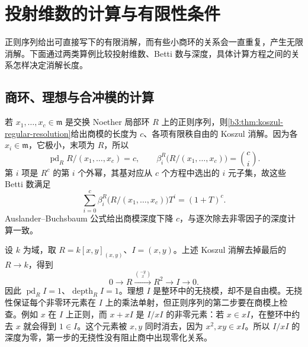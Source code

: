 
\section{投射维数的计算与有限性条件}
\label{b3:sec:1704}

正则序列给出可直接写下的有限消解，而有些小商环的关系会一直重复，产生无限消解。下面通过两类算例比较投射维数、Betti 数与深度，具体计算方程之间的关系怎样决定消解长度。

%
%
%

\subsection{商环、理想与合冲模的计算}
\label{b3:subsec:1704:01}

若 \(x_1,\ldots,x_c\in\mathfrak m\) 是交换 Noether 局部环 \(R\) 上的正则序列，则\cref{b3:thm:koszul-regular-resolution}给出商模的长度为 \(c\)、各项有限秩自由的 Koszul 消解。因为各 \(x_i\in\mathfrak m\)，它极小，末项为 \(R\)，所以
\[
	\operatorname{pd}_R R/(x_1,\ldots,x_c)=c,\qquad \beta_i^R\bigl(R/(x_1,\ldots,x_c)\bigr)=\binom ci.
\]
第 \(i\) 项是 \(R^c\) 的第 \(i\) 个外幂，其基对应从 \(c\) 个方程中选出的 \(i\) 元子集，故这些 Betti 数满足
\[
	\sum_{i=0}^c\beta_i^R\bigl(R/(x_1,\ldots,x_c)\bigr)T^i=(1+T)^c.
\]
Auslander–Buchsbaum 公式给出商模深度下降 \(c\)，与逐次除去非零因子的深度计算一致。

\ProseParagraphBreak
设 \(k\) 为域，取 \(R=k[x,y]_{(x,y)}\)、\(I=(x,y)\)。上述 Koszul 消解去掉最后的 \(R\to k\)，得到
\[
	0\longrightarrow R\xrightarrow{\binom{-y}{x}}R^2\longrightarrow I\longrightarrow0.
\]
因此 \(\operatorname{pd}_RI=1\)、\(\operatorname{depth}_RI=1\)。理想 \(I\) 是整环中的无挠模，却不是自由模。无挠性保证每个非零环元素在 \(I\) 上的乘法单射，但正则序列的第二步要在商模上检查。例如 \(x\) 在 \(I\) 上正则，而 \(x+xI\) 是 \(I/xI\) 的非零元素：若 \(x\in xI\)，在整环中约去 \(x\) 就会得到 \(1\in I\)。这个元素被 \(x,y\) 同时消去，因为 \(x^2,xy\in xI\)。所以 \(I/xI\) 的深度为零，第一步的无挠性没有阻止商中出现零化关系。


